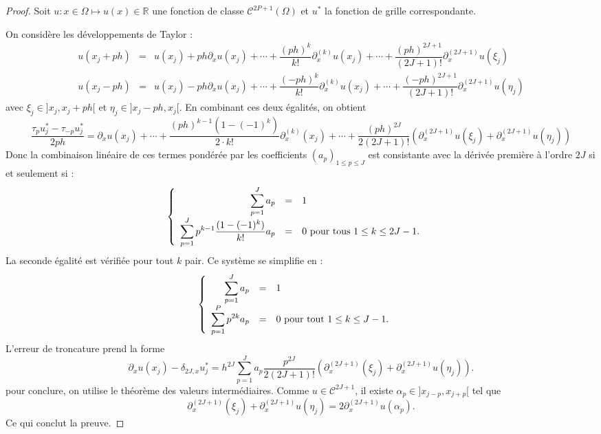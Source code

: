 \begin{proof}
Soit $u : x \in \Omega \mapsto u(x) \in \mathbb{R}$ une fonction de classe $\mathcal{C}^{2P+1}( \Omega)$ et $u^*$ la fonction de grille correspondante.

On considère les développements de Taylor :
\begin{equation}
\begin{array}{rcl}
u(x_j + ph) & = & u(x_j) + p h \partial_x u(x_j) + \cdots + \dfrac{(ph)^k}{k!}\partial_x^{(k)}u(x_j) + \cdots +\dfrac{(ph)^{2J+1}}{(2J+1)!} \partial_x^{(2J+1)}u (\xi_j)\\
u(x_j - ph) & = & u(x_j) - p h \partial_x u(x_j) + \cdots + \dfrac{(-ph)^k}{k!}\partial_x^{(k)}u(x_j) + \cdots +\dfrac{(-ph)^{2J+1}}{(2J+1)!} \partial_x^{(2J+1)}u(\eta_j)
\end{array}
\end{equation}
avec $\xi_j \in ]x_j, x_j+ph[$ et $\eta_j \in ]x_j-ph, x_j[$. En combinant ces deux égalités, on obtient
\begin{equation}
\dfrac{\tau_p u^*_j - \tau_{-p} u^*_j}{2ph} = \partial_x u(x_j) + \cdots + \dfrac{(ph)^{k-1}(1 - (-1)^k)}{2 \cdot k!} \partial_x^{(k)}(x_j) + \cdots +\dfrac{(ph)^{2J}}{2(2J+1)!} \left( \partial^{(2J+1)}_x u(\xi_j) + \partial_x^{(2J+1)}u(\eta_j) \right)
\end{equation}
Donc la combinaison linéaire de ces termes pondérée par les coefficients $(a_p)_{1 \leq p \leq J}$ est consistante avec la dérivée première à l'ordre $2J$ si et seulement si :
\begin{equation}
\left\lbrace
\begin{array}{rcll}
\displaystyle\sum\limits_{p=1}^J a_p & = & 1 & \\
\displaystyle\sum\limits_{p=1}^J p^{k-1} \dfrac{(1 - (-1)^k)}{k!} a_p & = & 0 \text{ pour tous } 1 \leq k \leq 2J-1.
\end{array}
\right.
\end{equation}
La seconde égalité est vérifiée pour tout $k$ pair. Ce système se simplifie en :
\begin{equation}
\left\lbrace
\begin{array}{rcll}
\displaystyle\sum\limits_{p=1}^J a_p & = & 1 & \\
\displaystyle\sum\limits_{p=1}^P p^{2k} a_p & = & 0 \text{ pour tout } 1 \leq k \leq J-1.
\end{array}
\right.
\end{equation}
L'erreur de troncature prend la forme
\begin{equation}
\partial_x u(x_j) - \delta_{2J,x} u^*_j = h^{2J} \sum_{p=1}^J a_p \dfrac{p^{2J}}{2(2J+1)!} \left( \partial_x^{(2J+1)}(\xi_j) + \partial_x^{(2J+1)}u(\eta_j) \right).
\end{equation}
pour conclure, on utilise le théorème des valeurs intermédiaires. Comme $u \in \mathcal{C}^{2J+1}$, il existe $\alpha_p \in ]x_{j-p}, x_{j+p}[$ tel que
\begin{equation}
\partial_x^{(2J+1)}(\xi_j) + \partial_x^{(2J+1)}u(\eta_j) = 2 \partial_x^{(2J+1)}u(\alpha_p).
\end{equation}
Ce qui conclut la preuve.
\end{proof}

